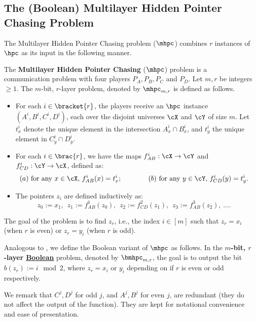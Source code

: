 \subsection{The (Boolean) Multilayer Hidden Pointer Chasing Problem}

The Multilayer Hidden Pointer Chasing problem ($\mhpc$) combines
$r$ instances of $\hpc$ as its input in the following manner.


\begin{definition}
  The \textbf{Multilayer Hidden Pointer Chasing} ($\mhpc$) problem is a
  communication problem with four players $P_A, P_B, P_C$ and $P_D$. Let $m,r$ be integers $\geq 1$. The $m$-bit, $r$-layer \mhpc problem, denoted by $\mhpc_{m,r}$ is defined as follows.
  \begin{itemize}
    \item For each $i \in \bracket{r}$, the players receive an $\hpc$ instance
      $(A^i, B^i, C^i, D^i)$, each over the disjoint universes
      $\cX$ and $\cY$ of size $m$.
      Let $t^i_x$ denote the unique element in the intersection
      $A^i_x \cap B^i_x$, and $t^i_y$ the unique element in $C^i_y \cap D^i_y$.
    \item For each $i \in \brac{r}$, we have the maps $f^i_{AB} : \cX \to \cY$
      and $f^i_{CD} : \cY \to \cX$, defined as:
      \[
        (a) ~ \textnormal{for any $x\in \cX$, $f^i_{AB}(x) = t^i_x$;}
        \qquad \qquad
        (b) ~ \textnormal{for any $y\in \cY$, $f^i_{CD}(y) = t^i_y$}.
      \]
    \item
      The pointers $z_i$ are defined inductively as:
      \[
        z_0 := x_1, ~~z_1 := f^1_{AB}(z_0),~~ z_2 := f^2_{CD}(z_1),
        ~~z_3 := f^3_{AB}(z_2),~\ldots.
      \]
  \end{itemize}

  The goal of the problem is to find $z_r$, i.e., the index $i \in [m]$ such that $z_r = x_i$ (when $r$ is even) or $z_r = y_i$ (when $r$ is odd). 

Analogous to \hpc, we define the Boolean variant of $\mhpc$ as follows. In the \textnormal{\textbf{$m$-bit, $r$-layer \underline{Boolean} \mhpc}} problem, denoted by $\bmhpc_{m,r}$, the goal is to output the bit $b(z_r):=i \mod 2$, where $z_r = x_i$ or $y_i$ depending on if $r$ is even or odd respectively. 
\end{definition}

We remark that $C^j, D^j$ for odd $j$, and $A^j, B^j$ for even $j$, are redundant (they do not affect the output of the function). They are kept for notational convenience and ease of presentation. 

